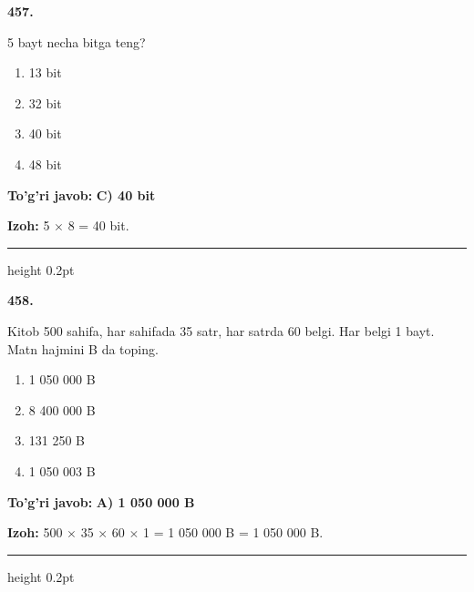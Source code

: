\documentclass[10pt,a4paper,oneside]{article}
\begin{document}
\noindent\textbf{\color{ink}457.}
\par
5 bayt necha bitga teng?
\begin{enumerate}[label=\Alph*),leftmargin=9mm]
\item 13 bit
\item 32 bit
\item 40 bit
\item 48 bit
\end{enumerate}
\begin{tcolorbox}[enhanced,breakable,colback=teal!4,colframe=teal!50!black,boxrule=0.5pt,arc=1.1mm,left=3mm,right=3mm,top=1.7mm,bottom=1.7mm,before skip=2mm,after skip=2mm]
\textbf{\color{teal}To'g'ri javob:} \textbf{C) 40 bit}
\par\smallskip
\textbf{Izoh:} 5 \ensuremath{\times} 8 = 40 bit.
\end{tcolorbox}
\vspace{2mm}\hrule height 0.2pt \vspace{3mm}

\noindent\textbf{\color{ink}458.}
\par
Kitob 500 sahifa, har sahifada 35 satr, har satrda 60 belgi. Har belgi 1 bayt. Matn hajmini B da toping.
\begin{enumerate}[label=\Alph*),leftmargin=9mm]
\item 1 050 000 B
\item 8 400 000 B
\item 131 250 B
\item 1 050 003 B
\end{enumerate}
\begin{tcolorbox}[enhanced,breakable,colback=teal!4,colframe=teal!50!black,boxrule=0.5pt,arc=1.1mm,left=3mm,right=3mm,top=1.7mm,bottom=1.7mm,before skip=2mm,after skip=2mm]
\textbf{\color{teal}To'g'ri javob:} \textbf{A) 1 050 000 B}
\par\smallskip
\textbf{Izoh:} 500 \ensuremath{\times} 35 \ensuremath{\times} 60 \ensuremath{\times} 1 = 1 050 000 B = 1 050 000 B.
\end{tcolorbox}
\vspace{2mm}\hrule height 0.2pt \vspace{3mm}
\end{document}
